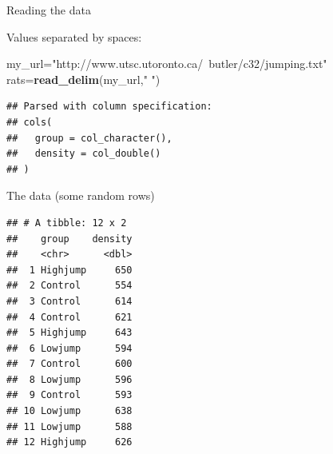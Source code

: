 \documentclass[ignorenonframetext,]{beamer}
\newenvironment{Shaded}{\begin{snugshade}}{\end{snugshade}}
\newcommand{\DecValTok}[1]{\textcolor[rgb]{0.00,0.00,0.81}{#1}}
\newcommand{\KeywordTok}[1]{\textcolor[rgb]{0.13,0.29,0.53}{\textbf{#1}}}
\newcommand{\NormalTok}[1]{#1}
\newcommand{\OperatorTok}[1]{\textcolor[rgb]{0.81,0.36,0.00}{\textbf{#1}}}
\newcommand{\StringTok}[1]{\textcolor[rgb]{0.31,0.60,0.02}{#1}}
\begin{document}
\begin{frame}[fragile]{Reading the data}
\protect\hypertarget{reading-the-data}{}

Values separated by spaces:

\begin{Shaded}
\begin{Highlighting}[]
\NormalTok{my_url=}\StringTok{"http://www.utsc.utoronto.ca/~butler/c32/jumping.txt"}
\NormalTok{rats=}\KeywordTok{read_delim}\NormalTok{(my_url,}\StringTok{" "}\NormalTok{)}
\end{Highlighting}
\end{Shaded}

\begin{verbatim}
## Parsed with column specification:
## cols(
##   group = col_character(),
##   density = col_double()
## )
\end{verbatim}

\end{frame}

\begin{frame}[fragile]{The data (some random rows)}
\protect\hypertarget{the-data-some-random-rows}{}

\begin{Shaded}
\end{Shaded}

\begin{verbatim}
## # A tibble: 12 x 2
##    group    density
##    <chr>      <dbl>
##  1 Highjump     650
##  2 Control      554
##  3 Control      614
##  4 Control      621
##  5 Highjump     643
##  6 Lowjump      594
##  7 Control      600
##  8 Lowjump      596
##  9 Control      593
## 10 Lowjump      638
## 11 Lowjump      588
## 12 Highjump     626
\end{verbatim}

\end{frame}
\end{document}

